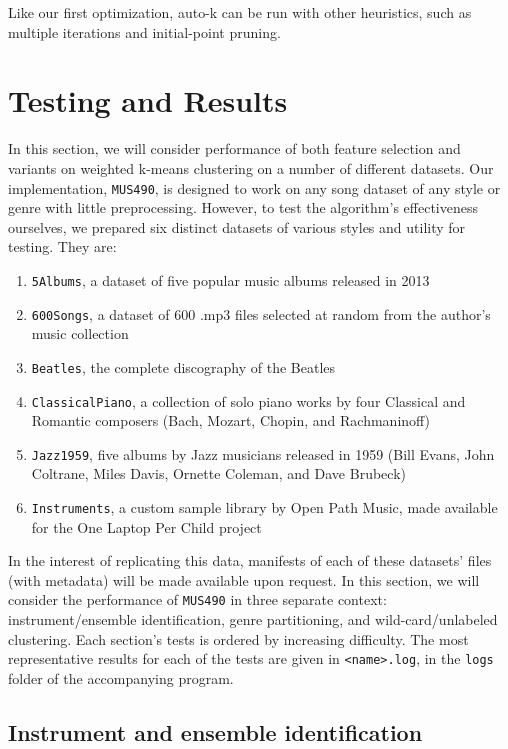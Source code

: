 \documentclass[12pt,twocolumn,titlepage]{article}
\begin{document}
Like our first optimization, auto-k can be run with other heuristics, such as multiple iterations and initial-point pruning. 


\section{Testing and Results}
\label{sec:testing}


In this section, we will consider performance of both feature selection and variants on weighted k-means clustering on a number of different datasets. Our implementation, \texttt{MUS490}, is designed to work on any song dataset of any style or genre with little preprocessing. However, to test the algorithm's effectiveness ourselves, we prepared six distinct datasets of various styles and utility for testing. They are:
\begin{enumerate}[itemsep=0mm]
\item{\texttt{5Albums}, a dataset of five popular music albums released in 2013}
\item{\texttt{600Songs}, a dataset of 600 .mp3 files selected at random from the author's music collection}
\item{\texttt{Beatles}, the complete discography of the Beatles}
\item{\texttt{ClassicalPiano}, a collection of solo piano works by four Classical and Romantic composers (Bach, Mozart, Chopin, and Rachmaninoff)}
\item{\texttt{Jazz1959}, five albums by Jazz musicians released in 1959 (Bill Evans, John Coltrane, Miles Davis, Ornette Coleman, and Dave Brubeck)}
\item{\texttt{Instruments}, a custom sample library by Open Path Music, made available for the One Laptop Per Child project} \cite{OpenPathMusic}
\end{enumerate}

In the interest of replicating this data, manifests of each of these datasets' files (with metadata) will be made available upon request. In this section, we will consider the performance of \texttt{MUS490} in three separate context: instrument/ensemble identification, genre partitioning, and wild-card/unlabeled clustering. Each section's tests is ordered by increasing difficulty. The most representative results for each of the tests are given in \texttt{<name>.log}, in the \texttt{logs} folder of the accompanying program.

\subsection{Instrument and ensemble identification}
\end{document}
